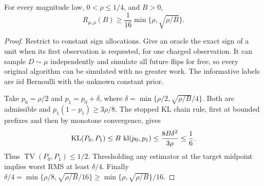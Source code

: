 \begin{lemma}\label{lem:tf-floor}
For every magnitude law, $0<\rho\le1/4$, and $B>0$,
\[
 R_{\mu,\rho}(B)\ge\frac1{16}
       \min\{\rho,\sqrt{\rho/B}\}.
\]
\end{lemma}
\begin{proof}
Restrict to constant sign allocations. Give an oracle the exact sign
of a unit when its first observation is requested, for one charged
observation. It can sample $D\sim\mu$
independently and simulate all future flips for free, so every original
algorithm can be simulated with no greater work. The informative labels
are iid Bernoulli with the unknown constant prior.

Take $p_0=\rho/2$ and $p_1=p_0+\delta$, where
$\delta=\min\{\rho/2,\sqrt{\rho/B}/4\}$. Both are admissible and
$p_1(1-p_1)\ge3\rho/8$. The stopped KL chain rule, first at bounded
prefixes and then by monotone convergence, gives
\[
 \operatorname{KL}(P_0,P_1)\le B\,\operatorname{kl}(p_0,p_1)
 \le\frac{8B\delta^2}{3\rho}\le\frac16.
\]
Thus $\operatorname{TV}(P_0,P_1)\le1/2$. Thresholding any estimator at
the target midpoint implies worst RMS at least $\delta/4$.
Finally
$\delta/4=\min\{\rho/8,\sqrt{\rho/B}/16\}
\ge\min\{\rho,\sqrt{\rho/B}\}/16$.
\end{proof}
